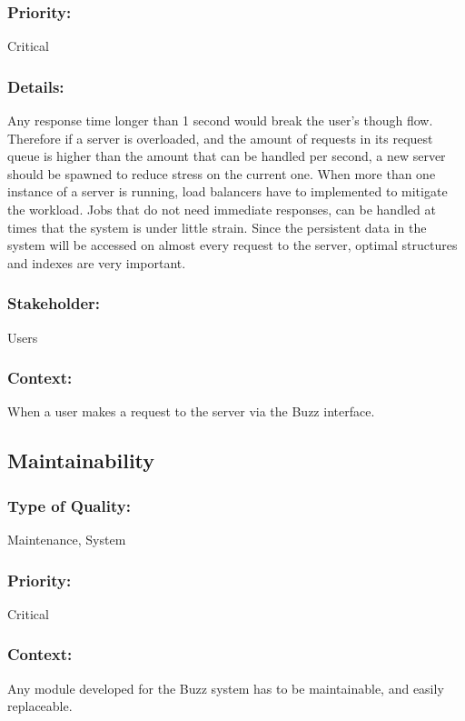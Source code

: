 \documentclass[11pt]{article}
\begin{document}
		\subsubsection{Priority:}
			\textbf{}Critical
		
		\subsubsection{Details:}
			\textbf{}Any response time longer than 1 second would break the user's though flow. Therefore if a server is overloaded, and the amount of requests in its request queue is higher than the amount that can be handled per second, a new server should be spawned to reduce stress on the current one. When more than one instance of a server is running, load balancers have to implemented to mitigate the workload. Jobs that do not need immediate responses, can be handled at times that the system is under little strain. Since the persistent data in the system will be accessed on almost every request to the server, optimal structures and indexes are very important.
		
		\subsubsection{Stakeholder:}
			\textbf{}Users

		\subsubsection{Context:}
			\textbf{}When a user makes a request to the server via the Buzz interface.
	\subsection{Maintainability}
		\subsubsection{Type of Quality:}
			\textbf{}Maintenance, System
		
		\subsubsection{Priority:}
			\textbf{}Critical

		\subsubsection{Context:}
			\textbf{}Any module developed for the Buzz system has to be maintainable, and easily replaceable.
		
\end{document}
